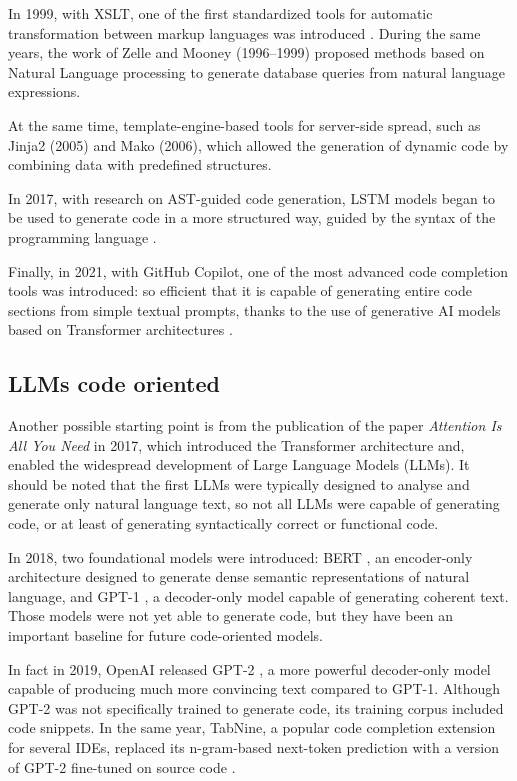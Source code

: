 In 1999, with XSLT, one of the first standardized tools for 
automatic transformation between markup languages was introduced 
\cite{xslt1999}. During the same years, the work of Zelle\cite{zelle1996learning}
and  Mooney\cite{mooney1997nlidb} (1996–1999) 
proposed methods based on Natural Language 
processing to generate database queries from natural language 
expressions.

At the same time, template-engine-based tools  for server-side 
spread, such as Jinja2 (2005)\cite{jinja2docs} 
and Mako (2006)\cite{makoengine}, 
which allowed the generation of 
dynamic code by combining data with predefined structures. 

In 2017, with research on AST-guided code generation, LSTM 
models began to be used to generate code in a more structured 
way, guided by the syntax of the programming language 
\cite{yin2017syntactic}.

Finally, in 2021, with GitHub Copilot, one of the most advanced 
code completion tools was introduced: so efficient that it is 
capable of generating entire code sections from simple textual 
prompts, thanks to the use of generative AI models based on 
Transformer architectures \cite{chen2021codex}.




\subsection{LLMs code oriented} %
Another possible starting point is from the publication of the 
paper \textit{Attention Is All You Need} in 2017, which 
introduced the Transformer architecture \cite{vaswani2017attention}
and, enabled the widespread development of
Large Language Models (LLMs). 
It should be noted that the first LLMs were typically designed 
to analyse and generate only natural language text, so not all LLMs 
were capable of generating code, or at least of generating syntactically 
correct or functional code.

In 2018, two foundational models were introduced: BERT 
\cite{devlin2019bert}, an encoder-only architecture 
designed to generate dense semantic representations of 
natural language, and GPT-1 \cite{radford2018improving}, 
a decoder-only model capable of generating coherent text. 
Those models were not yet able to generate code, but they have been 
an important baseline for future code-oriented models.

In fact in 2019, OpenAI released GPT-2 \cite{radford2019language}, 
a more powerful decoder-only model capable of producing much 
more convincing text compared to GPT-1. Although GPT-2 was 
not specifically trained to generate code, its training 
corpus included code snippets. In the same year, 
TabNine, a popular code completion extension for several IDEs, 
replaced its n-gram-based next-token prediction with a version 
of GPT-2 fine-tuned on source code \cite{tabnine2019}.

